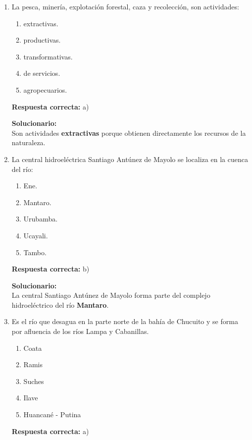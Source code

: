 \begin{enumerate}

	
	\item La pesca, minería, explotación forestal, caza y recolección, son actividades:
	\begin{enumerate}[label=\alph*)]
		\item extractivas.
		\item productivas.
		\item transformativas.
		\item de servicios.
		\item agropecuarios.
	\end{enumerate}
	\textbf{Respuesta correcta:} a)
	
	\vspace{2mm}
	\textbf{Solucionario:}\\
	Son actividades \textbf{extractivas} porque obtienen directamente los recursos de la naturaleza.
	

	
	\vspace{6mm}
	
	\item La central hidroeléctrica Santiago Antúnez de Mayolo se localiza en la cuenca del río:
	\begin{enumerate}[label=\alph*)]
		\item Ene.
		\item Mantaro.
		\item Urubamba.
		\item Ucayali.
		\item Tambo.
	\end{enumerate}
	\textbf{Respuesta correcta:} b)
	
	\vspace{2mm}
	\textbf{Solucionario:}\\
	La central Santiago Antúnez de Mayolo forma parte del complejo hidroeléctrico del río \textbf{Mantaro}.
	
	
	\vspace{6mm}
	
	\item Es el río que desagua en la parte norte de la bahía de Chucuito y se forma por afluencia de los ríos Lampa y Cabanillas.
	\begin{enumerate}[label=\alph*)]
		\item Coata
		\item Ramis
		\item Suches
		\item Ilave
		\item Huancané - Putina
	\end{enumerate}
	\textbf{Respuesta correcta:} a)
	

\end{enumerate}
